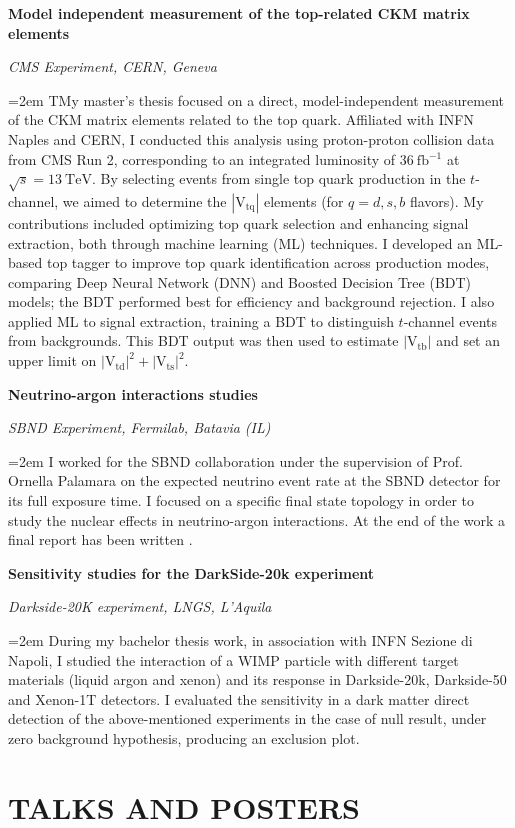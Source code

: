 \documentclass[fontsize=12pt]{article} %
\newcommand{\sepspace}{\vspace*{1em}}		%
\newcommand{\NewPart}[1]{\section*{\uppercase{#1}}}
\newcommand{\EducationEntry}[4]{
	\noindent \textbf{#1} \hfill      %
	{#2} \par  %
	\noindent \textit{#3} \par        %
	\noindent\hangindent=2em\hangafter=0 \small #4 %
	\normalsize \par}
\begin{document}
    \sepspace
    \EducationEntry{Model independent measurement of the top-related CKM matrix elements}{}{CMS Experiment, CERN, Geneva}{TMy master’s thesis focused on a direct, model-independent measurement of the CKM matrix elements related to the top quark. Affiliated with INFN Naples and CERN, I conducted this analysis using proton-proton collision data from CMS Run 2, corresponding to an integrated luminosity of \(\SI{36}{\femto\barn^{-1}}\) at \(\sqrt{s}=\SI{13}{\tera\electronvolt}\). By selecting events from single top quark production in the \(t\)-channel, we aimed to determine the \( |\text{V}_{\text{tq}}| \) elements (for \(q = d, s, b\) flavors).
	My contributions included optimizing top quark selection and enhancing signal extraction, both through machine learning (ML) techniques. I developed an ML-based top tagger to improve top quark identification across production modes, comparing Deep Neural Network (DNN) and Boosted Decision Tree (BDT) models; the BDT performed best for efficiency and background rejection. I also applied ML to signal extraction, training a BDT to distinguish \(t\)-channel events from backgrounds. This BDT output was then used to estimate \( |\text{V}_{\text{tb}}| \) and set an upper limit on \( |\text{V}_{\text{td}}|^{2} + |\text{V}_{\text{ts}}|^{2} \).}
    \vspace{-1mm}
    \sepspace   \vspace{2mm}
    \EducationEntry{Neutrino-argon interactions studies}{}{SBND Experiment, Fermilab, Batavia (IL)}{I worked for the SBND collaboration under the supervision of Prof. Ornella Palamara on the expected neutrino event rate at the SBND detector for its full exposure time. I focused on a specific final state topology in order to study the nuclear effects in neutrino-argon interactions. At the end of the work a final report has been written \cite{Fermilab_report}. }
    \sepspace
    \EducationEntry{Sensitivity studies for the DarkSide-20k experiment}{}{Darkside-20K experiment, LNGS, L'Aquila}{During my bachelor thesis work, in association with INFN Sezione di Napoli, I studied the interaction of a WIMP particle with different target materials (liquid argon and xenon) and its response in Darkside-20k, Darkside-50 and Xenon-1T detectors. I evaluated the sensitivity in a dark matter direct detection of the above-mentioned experiments in the case of null result, under zero background hypothesis, producing an exclusion plot.}
    \sepspace
	\NewPart{Talks and posters}
\end{document}
